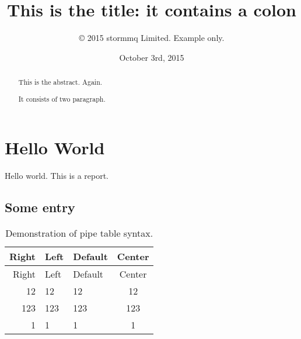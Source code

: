 \documentclass[en,a4paper,]{report}
\title{This is the title: it contains a colon}
\author{© 2015 stormmq Limited. Example only.}
\date{October 3rd, 2015}
\begin{document}
\maketitle
\begin{abstract}
This is the abstract. Again.

It consists of two paragraph.
\end{abstract}

{
\hypersetup{linkcolor=black}
\setcounter{tocdepth}{3}
\tableofcontents
}
\listoftables
\listoffigures
\chapter{Hello World}\label{hello-world}

Hello world. This is a report.

\section{Some entry}\label{some-entry}

\begin{longtable}[c]{@{}rllc@{}}
\caption{Demonstration of pipe table syntax.}\tabularnewline
\toprule
Right & Left & Default & Center\tabularnewline
\midrule
\endfirsthead
\toprule
Right & Left & Default & Center\tabularnewline
\midrule
\endhead
12 & 12 & 12 & 12\tabularnewline
123 & 123 & 123 & 123\tabularnewline
1 & 1 & 1 & 1\tabularnewline
\bottomrule
\end{longtable}
\end{document}
